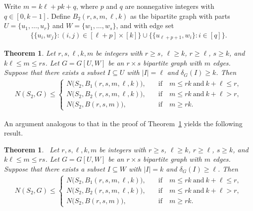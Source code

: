 \documentclass[11pt,a4paper]{article}
\newtheorem{theorem}[definition]{Theorem}
\begin{document}
Write $m = k \ell + p k + q$, where $p$ and $q$ are nonnegative integers with $q \in [0, k - 1]$. 
Define $B_{2}(r, s, m, \ell, k)$ as the bipartite graph with parts $U = \{u_1, \ldots, u_{r} \}$ and $W = \{w_1, \ldots, w_{s} \}$, and with edge set
\begin{align*}
    \big\{ \{u_i, w_j\} \colon (i,j) \in [\ell+p] \times [k] \big\}
    \cup \big\{ \{u_{\ell+p+1}, w_i\} \colon i \in [q] \big\}. 
\end{align*}

\begin{theorem}\label{Thm:biparite-ell-k-Z_{1}(G)}
    Let $r, s, \ell, k, m$ be integers with $r \ge s$, $\ell \ge k$, $r \ge \ell$, $s \ge k$, and $k \ell \le m \le rs$. 
    Let $G = G[U, W]$ be an $r\times s$ bipartite graph with $m$ edges. 
    Suppose that there exists a subset $I \subseteq U$ with $|I| = \ell$ and $\delta_{G}(I) \ge k$. 
    Then 
    \begin{align*}
        N(S_2, G)
        \le 
        \begin{cases}
            N\big( S_2, B_1(r,s,m,\ell,k) \big), &\quad\text{if}\quad m \le rk ~\text{and}~ k + \ell \le r, \\[0.5em]
            N\big( S_2, B_2(r,s,m,\ell,k) \big), &\quad\text{if}\quad m \le rk ~\text{and}~ k + \ell > r, \\[0.5em]
            N\big( S_2, B(r,s,m) \big), &\quad\text{if}\quad m \ge r k. 
        \end{cases}
    \end{align*}
\end{theorem}


An argument analogous to that in the proof of Theorem~\ref{Thm:biparite-ell-k-Z_{1}(G)} yields the following result.
%
\begin{theorem}~\label{Thm:biparite-k-ell-Z_{1}(G)}
    Let $r, s, \ell, k, m$ be integers with $r \ge s$, $\ell \ge k$, $r \ge \ell$, $s \ge k$, and $k \ell \le m \le rs$.  
    Let $G = G[U, W]$ be an $r\times s$ bipartite graph with $m$ edges. 
    Suppose that there exists a subset $I \subseteq W$ with $|I| = k$ and $\delta_{G}(I) \ge \ell$. 
    Then 
    \begin{align*}
        N(S_2, G)
        \le 
        \begin{cases}
            N\big( S_2, B_1(r,s,m,\ell,k) \big), &\quad\text{if}\quad m \le rk ~\text{and}~ k + \ell \le r, \\[0.5em]
            N\big( S_2, B_2(r,s,m,\ell,k) \big), &\quad\text{if}\quad m \le rk ~\text{and}~ k + \ell > r, \\[0.5em]
            N\big( S_2, B(r,s,m) \big), &\quad\text{if}\quad m \ge r k. 
        \end{cases}
    \end{align*}
\end{theorem}
\end{document}
